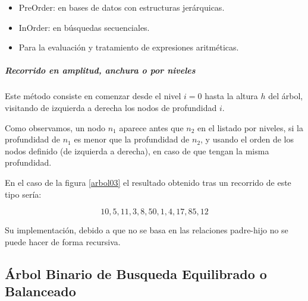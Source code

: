 \documentclass[a4paper, 11pt, titlepage]{article}
\begin{document}
            \begin{itemize}
                \item PreOrder: en bases de datos con estructuras jerárquicas.
                \item InOrder: en búsquedas secuenciales.
                \item Para la evaluación y tratamiento de expresiones aritméticas.
            \end{itemize}

            \subparagraph{Recorrido en amplitud, anchura o por niveles} Este método consiste en comenzar 
            desde el nivel $i=0$ hasta la altura $h$ del árbol, visitando de izquierda a derecha los nodos 
            de profundidad $i$.

            Como observamos, un nodo $n_1$ aparece antes 
            que $n_2$ en el listado por niveles, si la 
            profundidad de $n_1$ es menor que la profundidad de $n_2$, y usando el orden de los nodos definido 
            (de izquierda a derecha), en caso de que tengan la misma profundidad.

            En el caso de la figura \ref{arbol03} el resultado obtenido tras un recorrido de este tipo 
            sería:

            \[ 10, 5, 11, 3, 8, 50, 1, 4, 17, 85, 12 \]

            Su implementación, debido a que no se basa en las relaciones padre-hijo no se puede hacer de forma 
            recursiva.


    \subsection{Árbol Binario de Busqueda Equilibrado o Balanceado}
\end{document}
